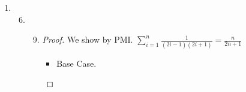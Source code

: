 \documentclass[12pt,letterpaper]{article}
\begin{document}
\begin{enumerate}
\begin{enumerate}
\begin{enumerate}
\begin{proof}
\begin{itemize}
                    So $A_l \subseteq A_1$, since $1 \leq l$, and $\mathcal{A}$ is a decreasing nested family of sets.

                    Then $A_l \subseteq A_1, x \in A_1$.

                    Since the choice of $x$ was arbitrary, this works for all $x \in \bigcup\limits_{i = 1}^{\infty} A_i$.

                    Then every $x$ contained in $\bigcup\limits_{i = 1}^{\infty} A_i$ is also in $A_1$.

                    Thus, $\bigcup\limits_{i = 1}^{\infty} A_i \subseteq A_1$.
                  \item $(\supseteq)$

                    \begin{align*}
                      A_1 &\subseteq A_1 \\
                      &\subseteq A_1 \cup A_2 \\
                      &\subseteq A_1 \cup A_2 \cup A_3 \\
                      &\ \ \vdots \\
                      &\subseteq \bigcup\limits_{i = 1}^{\infty} A_i \\
                    \end{align*}
                \end{itemize}

                Since we have shown both sides.

                We have $\bigcup\limits_{i = 1}^{\infty} A_i = A_1$
              \end{proof}
          \end{enumerate}
        \item
          \begin{enumerate}
            \setcounter{enumiii}{2}
            \item Let $A_i = \{0, 1\}$, then $\mathcal{A} = \{\{0, 1\}\}$, and $\bigcap\limits_{i = 1}^{\infty}A_i = \{0, 1\}$
            \item Let $A_i = \varnothing$, then $\mathcal{A} = \{\varnothing\}$, and $\bigcap\limits_{i = 1}^{\infty}A_i = \varnothing$
          \end{enumerate}
      \end{enumerate}
    \item
      \begin{enumerate}
        \setcounter{enumii}{5}
        \item
          \begin{enumerate}
            \setcounter{enumiii}{8}
            \item
              \begin{proof}
                We show by PMI.
                $\sum\limits_{i = 1}^n \frac{1}{\left(2i - 1\right)\left(2i + 1\right)} = \frac{n}{2n + 1}$
                \begin{itemize}
                  \item Base Case.


\end{itemize}
\end{proof}
\end{enumerate}
\end{enumerate}
\end{enumerate}
\end{document}
